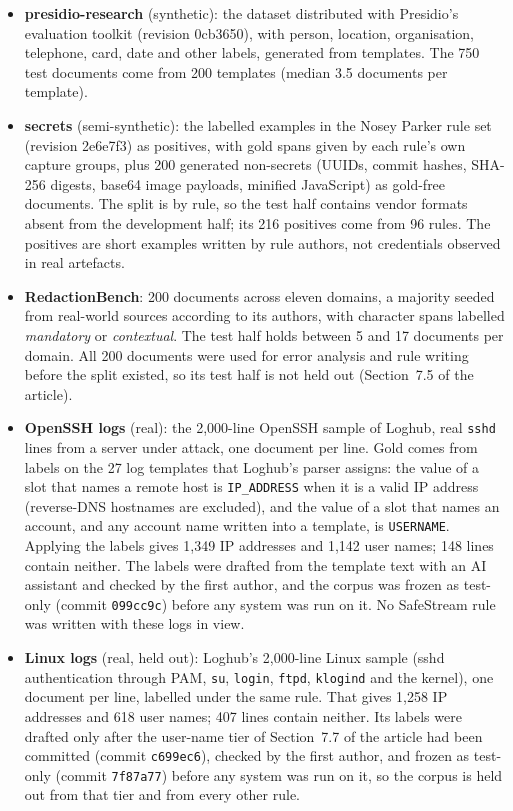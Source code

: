 \documentclass[11pt,a4paper]{article}
\begin{document}
\begin{itemize}
\item \textbf{presidio-research} (synthetic): the dataset distributed with Presidio's evaluation toolkit (revision 0cb3650), with person, location, organisation, telephone, card, date and other labels, generated from templates. The 750 test documents come from 200 templates (median 3.5 documents per template).
\item \textbf{secrets} (semi-synthetic): the labelled examples in the Nosey Parker rule set (revision 2e6e7f3) as positives, with gold spans given by each rule's own capture groups, plus 200 generated non-secrets (UUIDs, commit hashes, SHA-256 digests, base64 image payloads, minified JavaScript) as gold-free documents. The split is by rule, so the test half contains vendor formats absent from the development half; its 216 positives come from 96 rules. The positives are short examples written by rule authors, not credentials observed in real artefacts.
\item \textbf{RedactionBench}: 200 documents across eleven domains, a majority seeded from real-world sources according to its authors, with character spans labelled \emph{mandatory} or \emph{contextual}. The test half holds between 5 and 17 documents per domain. All 200 documents were used for error analysis and rule writing before the split existed, so its test half is not held out (Section~7.5 of the article).
\item \textbf{OpenSSH logs} (real): the 2,000-line OpenSSH sample of Loghub, real \texttt{sshd} lines from a server under attack, one document per line. Gold comes from labels on the 27 log templates that Loghub's parser assigns: the value of a slot that names a remote host is \texttt{IP\_ADDRESS} when it is a valid IP address (reverse-DNS hostnames are excluded), and the value of a slot that names an account, and any account name written into a template, is \texttt{USERNAME}. Applying the labels gives 1,349 IP addresses and 1,142 user names; 148 lines contain neither. The labels were drafted from the template text with an AI assistant and checked by the first author, and the corpus was frozen as test-only (commit \texttt{099cc9c}) before any system was run on it. No SafeStream rule was written with these logs in view.
\item \textbf{Linux logs} (real, held out): Loghub's 2,000-line Linux sample (sshd authentication through PAM, \texttt{su}, \texttt{login}, \texttt{ftpd}, \texttt{klogind} and the kernel), one document per line, labelled under the same rule. That gives 1,258 IP addresses and 618 user names; 407 lines contain neither. Its labels were drafted only after the user-name tier of Section~7.7 of the article had been committed (commit \texttt{c699ec6}), checked by the first author, and frozen as test-only (commit \texttt{7f87a77}) before any system was run on it, so the corpus is held out from that tier and from every other rule.

\end{itemize}
\end{document}
